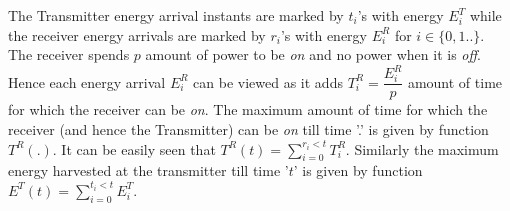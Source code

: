 The Transmitter energy arrival instants are marked by $t_i$'s with energy $E^{T}_i$ while the receiver energy arrivals are marked by $r_i$'s with energy $E^{R}_i$ for $i \in \{0,1..\}$. The receiver spends $p$ amount of power to be \textit{on} and no power when it is \textit{off}. Hence each energy arrival $E^{R}_i$ can be viewed as it adds $T^{R}_i=\dfrac{E^{R}_i}{p}$ amount of time for which the receiver can be \textit{on}. The maximum amount of time for which the receiver (and hence the Transmitter) can be \textit{on} till time '.' is given by function $T^{R}(.)$. It can be easily seen that $T^{R}(t)=\sum_{i=0}^{r_i<t}T^{R}_i$. Similarly the maximum energy harvested at the transmitter till time '$t$' is given by function $E^{T}(t)=\sum_{i=0}^{t_i<t}E^{T}_i$.